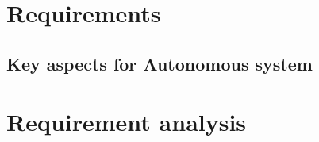 \documentclass{llncs}
\newcommand{\labelsec}[1]{\label{sec:#1}}
\begin{document}

%
%
\newpage
\section{Requirements}
\labelsec{Requirements}
\newpage
\subsection{Key aspects for Autonomous system}
\newpage
\section{Requirement analysis}
\labelsec{ReqAnalysis}
\end{document}
